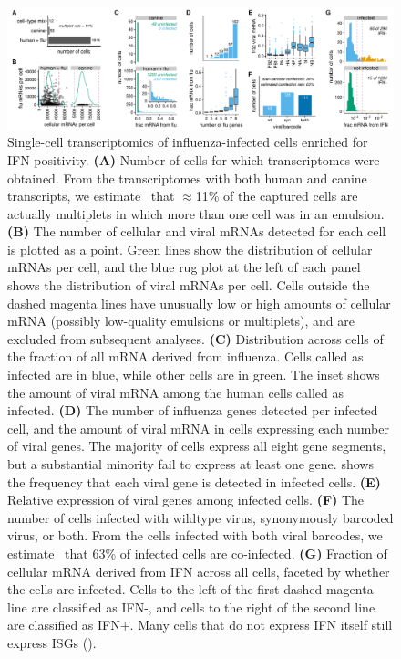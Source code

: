 \documentclass[9pt,lineno]{elife}
\begin{document}
\begin{figure}
\begin{fullwidth}

\includegraphics[width=\linewidth, clip=false]{figures/single_cell_figures/p_cell_summary.pdf}

\caption{
Single-cell transcriptomics of influenza-infected cells enriched for IFN positivity.
{\bf (A)} 
Number of cells for which transcriptomes were obtained.
From the transcriptomes with both human and canine transcripts, we estimate~\citep{bloom2018estimating} that $\approx$11\% of the captured cells are actually multiplets in which more than one cell was in an emulsion. 
{\bf (B)} The number of cellular and viral mRNAs detected for each cell is plotted as a point.
Green lines show the distribution of cellular mRNAs per cell, and the blue rug plot at the left of each panel shows the distribution of viral mRNAs per cell.
Cells outside the dashed magenta lines have unusually low or high amounts of cellular mRNA (possibly low-quality emulsions or multiplets), and are excluded from subsequent analyses.
{\bf (C)} Distribution across cells of the fraction of all mRNA derived from influenza.
Cells called as infected are in blue, while other cells are in green.
The inset shows the amount of viral mRNA among the human cells called as infected.
{\bf (D)} The number of influenza genes detected per infected cell, and the amount of viral mRNA in cells expressing each number of viral genes.
The majority of cells express all eight gene segments, but a substantial minority fail to express at least one gene.
 shows the frequency that each viral gene is detected in infected cells.
{\bf (E)} Relative expression of viral genes among infected cells.
{\bf (F)} The number of cells infected with wildtype virus, synonymously barcoded virus, or both.
From the cells infected with both viral barcodes, we estimate~\citep{bloom2018estimating} that 63\% of infected cells are co-infected.
{\bf (G)} Fraction of cellular mRNA derived from IFN across all cells, faceted by whether the cells are infected.
Cells to the left of the first dashed magenta line are classified as IFN-, and cells to the right of the second line are classified as IFN+.
Many cells that do not express IFN itself still express ISGs ().
}
\label{fig:transcriptomics}


\end{fullwidth}
\end{figure}
\end{document}
